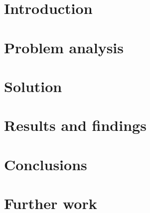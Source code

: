 \documentclass[10pt,oneside]{article}
\begin{document}





\section{Introduction}




\section{Problem analysis}
\label{sec:problem}


\section{Solution}
\label{sec:solution}


\section{Results and findings}
\label{sec:results}


\section{Conclusions}


\section{Further work}







\nocite{*}

\end{document}
